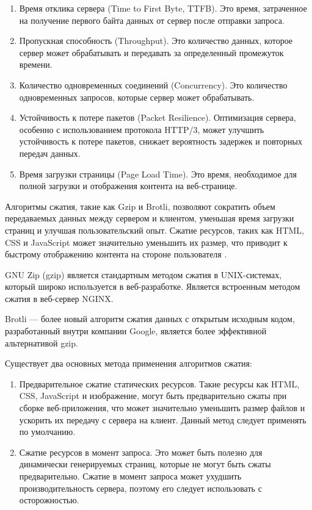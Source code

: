 \begin{enumerate} 
  \item Время отклика сервера (Time to First Byte, TTFB). Это время, затраченное на получение первого байта данных от сервер после отправки запроса.
  
  \item Пропускная способность (Throughput). Это количество данных, которое сервер может обрабатывать и передавать за определенный промежуток времени.

  \item Количество одновременных соединений (Concurrency). Это количество одновременных запросов, которые сервер может обрабатывать.

  \item Устойчивость к потере пакетов (Packet Resilience). Оптимизация сервера, особенно с использованием протокола HTTP/3, может улучшить устойчивость к потере пакетов, снижает вероятность задержек и повторных передач данных.

  \item Время загрузки страницы (Page Load Time). Это время, необходимое для полной загрузки и отображения контента на веб-странице.
\end{enumerate}

Алгоритмы сжатия, такие как Gzip и Brotli, позволяют сократить объем передаваемых данных между сервером и клиентом, уменьшая время загрузки страниц и улучшая пользовательский опыт. Сжатие ресурсов, таких как HTML, CSS и JavaScript может значительно уменьшить их размер, что приводит к быстрому отображению контента на стороне пользователя \cite{compression}.

GNU Zip (gzip) является стандартным методом сжатия в UNIX-системах, который широко используется в веб-разработке. Является встроенным методом сжатия в веб-сервер NGINX.

Brotli — более новый алгоритм сжатия данных с открытым исходным кодом, разработанный внутри компании Google, является более эффективной альтернативой gzip.

Существует два основных метода применения алгоритмов сжатия:

\begin{enumerate} 
  \item Предварительное сжатие статических ресурсов. Такие ресурсы как HTML, CSS, JavaScript и изображение, могут быть предварительно сжаты при сборке веб-приложения, что может значительно уменьшить размер файлов и ускорить их передачу с сервера на клиент. Данный метод следует применять по умолчанию.
  
  \item Сжатие ресурсов в момент запроса. Это может быть полезно для динамически генерируемых страниц, которые не могут быть сжаты предварительно. Сжатие в момент запроса может ухудшить производительность сервера, поэтому его следует использовать с осторожностью.
\end{enumerate}

